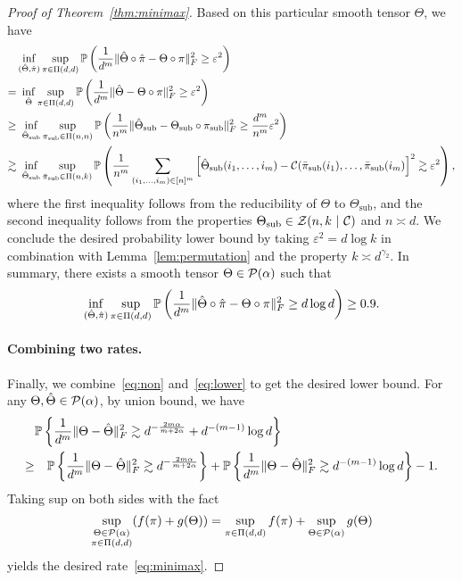 \documentclass[11pt]{article}
\theoremstyle{definition}
\begin{document}
\begin{proof}[Proof of Theorem~\ref{thm:minimax}]
Based on this particular smooth tensor $\Theta$, we have
\begin{align}\label{eq:lower}
&\inf_{(\hat \Theta,\hat \pi)}\sup_{\pi\in \Pi(d,d)}\mathbb{P}\left({1\over d^m}\FnormSize{}{\hat \Theta\circ \hat \pi-\Theta\circ \pi}^2\geq \varepsilon^2\right)\notag \\
=&\ \inf_{\hat \Theta}\sup_{\pi\in \Pi(d,d)}\mathbb{P}\left({1\over d^m}\FnormSize{}{\hat \Theta-\Theta\circ \pi}^2\geq \varepsilon^2\right)\notag \\
\geq & \ \inf_{\hat  \Theta_{\text{sub}}}\sup_{\pi_{\text{sub}}\in\Pi(n,n)}\mathbb{P}\left({1\over n^m}\FnormSize{}{\hat \Theta_\text{sub}-\Theta_{\text{sub}}\circ \pi_{\text{sub}}}^2\geq {d^m\over n^m} \varepsilon^2\right)\notag \\
\gtrsim & \ \inf_{\hat  \Theta_{\text{sub}}}\sup_{\bar \pi_{\text{sub}}\in\Pi(n,k)}\mathbb{P}\left({1\over n^m}\sum_{(i_1,\ldots,i_m)\in[n]^m}\left[\hat \Theta_\text{sub}(i_1,\ldots,i_m)-\tC(\bar \pi_{\text{sub}}(i_1),\ldots,\bar \pi_{\text{sub}}(i_m)\right]^2\gtrsim \varepsilon^2\right),
\end{align}
where the first inequality follows from the reducibility of $\Theta$ to $\Theta_{\text{sub}}$, and the second inequality follows from the properties $\Theta_{\text{sub}}\in \mathcal{Z}(n,k\ |\ \mathcal{C})$ and $n\asymp d$. 
We conclude the desired probability lower bound by taking $\varepsilon^2={d\log k }$ in combination with Lemma~\ref{lem:permutation} and the property $k\asymp d^{\gamma_2}$. In summary, there exists a smooth tensor $\Theta\in\mathcal{P}(\alpha)$ such that
\[
\inf_{(\hat \Theta,\hat \pi)}\sup_{\pi\in \Pi(d,d)}\mathbb{P}\left({1\over d^m}\lVert\hat \Theta\circ \hat \pi-\Theta\circ \pi\rVert_F^2\geq d\log d\right) \geq 0.9.
\]


\paragraph{Combining two rates.} Finally, we combine~\eqref{eq:non} and~\eqref{eq:lower} to get the desired lower bound. For any $\Theta, \hat \Theta \in \mathcal{P}(\alpha)$, by union bound, we have
\begin{align}
&\mathbb{P}\left\{ {1\over d^m}\lVert\Theta-\hat \Theta\rVert_F^2\gtrsim d^{-{2m\alpha\over m+2\alpha}}+d^{-(m-1)}\log d\right\}\\
\geq &\quad \mathbb{P}\left\{ {1\over d^m}\lVert\Theta-\hat \Theta\rVert_F^2\gtrsim d^{-{2m\alpha\over m+2\alpha}}\right\} +\mathbb{P}\left\{ {1\over d^m}\lVert\Theta-\hat \Theta\rVert_F^2\gtrsim d^{-(m-1)}\log d\right\}-1.
\end{align}
Taking sup on both sides with the fact 
\[
\sup_{\substack{\Theta\in \mathcal{P}(\alpha)\\\pi\in \Pi(d,d)}}(f(\pi)+g(\Theta))=\sup_{\pi\in \Pi(d,d)}f(\pi)+\sup_{\Theta\in \mathcal{P}(\alpha)}g(\Theta)
\]
yields the desired rate~\eqref{eq:minimax}. 
\end{proof}
\end{document}
